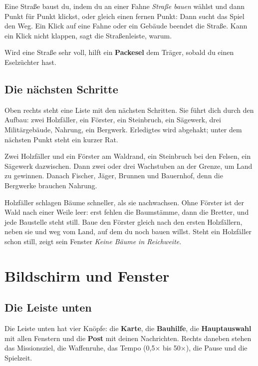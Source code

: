 \documentclass[a4paper,11pt,oneside,DIV=12,headings=small,toc=chapterentrydotfill]{scrbook}
\begin{document}
Eine Straße baust du, indem du an einer Fahne \emph{Straße bauen} wählst und dann Punkt für Punkt klickst,
oder gleich einen fernen Punkt: Dann sucht das Spiel den Weg. Ein Klick auf eine Fahne oder ein Gebäude
beendet die Straße. Kann ein Klick nicht klappen, sagt die Straßenleiste, warum.

Wird eine Straße sehr voll, hilft ein \textbf{Packesel} dem Träger, sobald du einen Eselzüchter hast.

\section{Die nächsten Schritte}
Oben rechts steht eine Liste mit den nächsten Schritten. Sie führt dich durch den Aufbau: zwei Holzfäller,
ein Förster, ein Steinbruch, ein Sägewerk, drei Militärgebäude, Nahrung, ein Bergwerk. Erledigtes wird
abgehakt; unter dem nächsten Punkt steht ein kurzer Rat.

\begin{tipbox}
Zwei Holzfäller und ein Förster am Waldrand, ein Steinbruch bei den Felsen, ein Sägewerk dazwischen.
Dann zwei oder drei Wachstuben an der Grenze, um Land zu gewinnen. Danach Fischer, Jäger, Brunnen
und Bauernhof, denn die Bergwerke brauchen Nahrung.
\end{tipbox}

\begin{tipbox}
Holzfäller schlagen Bäume schneller, als sie nachwachsen. Ohne Förster ist der Wald nach einer Weile leer:
erst fehlen die Baumstämme, dann die Bretter, und jede Baustelle steht still. Baue den Förster gleich nach
den ersten Holzfällern, neben sie und weg vom Land, auf dem du noch bauen willst. Steht ein Holzfäller schon
still, zeigt sein Fenster \emph{Keine Bäume in Reichweite}.
\end{tipbox}

\chapter{Bildschirm und Fenster}

\section{Die Leiste unten}
Die Leiste unten hat vier Knöpfe: die \textbf{Karte}, die \textbf{Bauhilfe}, die \textbf{Hauptauswahl} mit
allen Fenstern und die \textbf{Post} mit deinen Nachrichten. Rechts daneben stehen das Missionsziel, die
Waffenruhe, das Tempo (0,5× bis 50×), die Pause und die Spielzeit.
\end{document}
